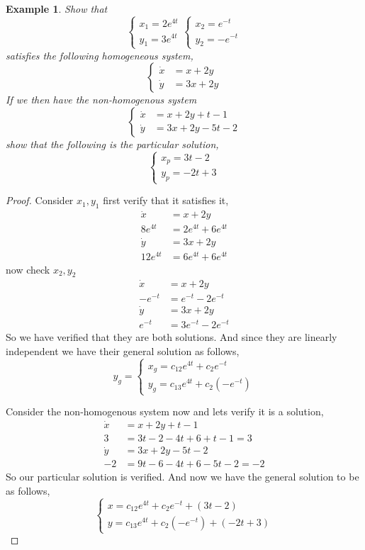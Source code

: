 \documentclass[oneside,11pt,pdftex,final]{book}%
\numberwithin{equation}{section}
\newtheorem{example}[theorem]{Example}
\numberwithin{section}{chapter}
\numberwithin{equation}{chapter}
\begin{document}
\begin{example}
	Show that \[ \begin{cases}
		x_1=2e^{4t}\\
		y_1=3e^{4t}
	\end{cases} \begin{cases}
		x_2=e^{-t}\\
		y_2=-e^{-t}
	\end{cases}\]
satisfies the following homogeneous system,
\[ \begin{cases}
	\dot{x}&=x+2y\\
	\dot{y}&=3x+2y
\end{cases} \]
If we then have the non-homogenous system 
\[ \begin{cases}
	\dot{x}&=x+2y+t-1\\
	\dot{y}&=3x+2y-5t-2
\end{cases} \]
show that the following is the particular solution,
\[ \begin{cases}
	x_p=3t-2\\
	y_p=-2t+3
\end{cases} \]
\end{example}
\begin{proof}
	Consider $ x_1,y_1 $ first verify that it satisfies it,
	\begin{align*}
		\dot{x}&=x+2y\\
		8e^{4t}&=2e^{4t}+6e^{4t}\\
		\dot{y}&=3x+2y\\
		12e^{4t}&=6e^{4t}+6e^{4t}
	\end{align*}
	now check $ x_2,y_2 $
	\begin{align*}
		\dot{x}&=x+2y\\
		-e^{-t}&=e^{-t}-2e^{-t}\\
		\dot{y}&=3x+2y\\
		e^{-t}&=3e^{-t}-2e^{-t}
	\end{align*}
	So we have verified that they are both solutions. And since they are linearly independent we have their general solution as follows,
	\[y_g= \begin{cases}
		x_g=c_12e^{4t}+c_2e^{-t}\\
		y_g=c_13e^{4t}+c_2(-e^{-t})
	\end{cases} \]
	\par Consider the non-homogenous system now and lets verify it is a solution,
	\begin{align*}
		\dot{x}&=x+2y+t-1\\
		3&=3t-2-4t+6+t-1=3\\
		\dot{y}&=3x+2y-5t-2\\
		-2&=9t-6-4t+6-5t-2=-2
	\end{align*}
	So our particular solution is verified. And now we have the general solution to be as follows,
		\[ \begin{cases}
		x=c_12e^{4t}+c_2e^{-t}+(3t-2)\\
		y=c_13e^{4t}+c_2(-e^{-t})+(-2t+3)
	\end{cases} \]
\end{proof}
\end{document}

